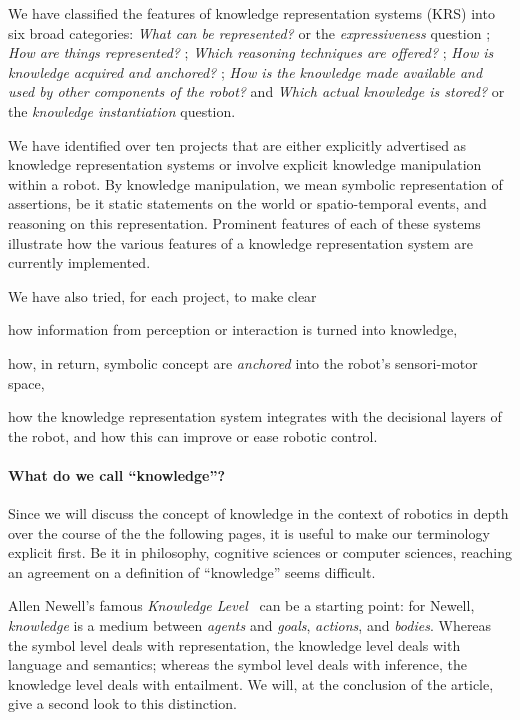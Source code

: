 \documentclass[journal]{IEEEtran}
\begin{document}
We have classified the features of knowledge representation systems (KRS) into
six broad categories: \emph{What can be represented?} or the
\emph{expressiveness} question ; \emph{How are things represented?} ; \emph{Which
reasoning techniques are offered?} ; \emph{How is knowledge acquired and
anchored?} ; \emph{How is the knowledge made available and used by other
components of the robot?} and \emph{Which actual knowledge is stored?} or the
\emph{knowledge instantiation} question.

We have identified over ten projects that are either explicitly advertised as
knowledge representation systems or involve explicit knowledge manipulation
within a robot. By knowledge manipulation, we mean symbolic representation of
assertions, be it static statements on the world or spatio-temporal events, and
reasoning on this representation. Prominent features of each of these systems
illustrate how the various features of a knowledge representation system are
currently implemented.

We have also tried, for each project, to make clear \begin{inparaenum} \item
how information from perception or interaction is turned into knowledge,
\item how, in return, symbolic concept are \emph{anchored} into the robot's
sensori-motor space, \item how the knowledge representation system integrates
with the decisional layers of the robot, and how this can improve or ease
robotic control.\end{inparaenum}


\paragraph{What do we call ``knowledge''?}
\label{sect|on-knowledge}

Since we will discuss the concept of knowledge in the context of robotics in 
depth over the course of the the following pages, it is useful to make our 
terminology explicit first.
% 
Be it in philosophy, cognitive sciences or computer sciences, reaching an
agreement on a definition of ``knowledge'' seems difficult.

Allen Newell's famous \emph{Knowledge Level}~\cite{Newell1981} can be a
starting point: for Newell, \emph{knowledge} is a medium between \emph{agents}
and \emph{goals}, \emph{actions}, and \emph{bodies}. Whereas the symbol level deals
with representation, the knowledge level deals with language and semantics;
whereas the symbol level deals with inference, the knowledge level deals with
entailment. We will, at the conclusion of the article, give a second look to
this distinction.
\end{document}
